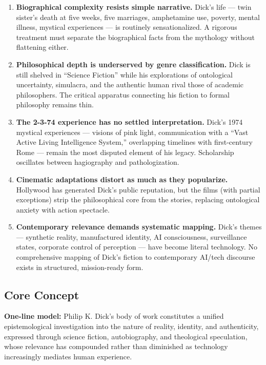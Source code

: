 \documentclass[11pt,letterpaper]{article}
\begin{document}
\begin{enumerate}[leftmargin=2em]
\item \textbf{Biographical complexity resists simple narrative.} Dick's life --- twin sister's death at five weeks, five marriages, amphetamine use, poverty, mental illness, mystical experiences --- is routinely sensationalized. A rigorous treatment must separate the biographical facts from the mythology without flattening either.

\item \textbf{Philosophical depth is underserved by genre classification.} Dick is still shelved in ``Science Fiction'' while his explorations of ontological uncertainty, simulacra, and the authentic human rival those of academic philosophers. The critical apparatus connecting his fiction to formal philosophy remains thin.

\item \textbf{The 2-3-74 experience has no settled interpretation.} Dick's 1974 mystical experiences --- visions of pink light, communication with a ``Vast Active Living Intelligence System,'' overlapping timelines with first-century Rome --- remain the most disputed element of his legacy. Scholarship oscillates between hagiography and pathologization.

\item \textbf{Cinematic adaptations distort as much as they popularize.} Hollywood has generated Dick's public reputation, but the films (with partial exceptions) strip the philosophical core from the stories, replacing ontological anxiety with action spectacle.

\item \textbf{Contemporary relevance demands systematic mapping.} Dick's themes --- synthetic reality, manufactured identity, AI consciousness, surveillance states, corporate control of perception --- have become literal technology. No comprehensive mapping of Dick's fiction to contemporary AI/tech discourse exists in structured, mission-ready form.
\end{enumerate}

\subsection{Core Concept}

\begin{quotebox}
\textbf{One-line model:} Philip K. Dick's body of work constitutes a unified epistemological investigation into the nature of reality, identity, and authenticity, expressed through science fiction, autobiography, and theological speculation, whose relevance has compounded rather than diminished as technology increasingly mediates human experience.
\end{quotebox}
\end{document}
